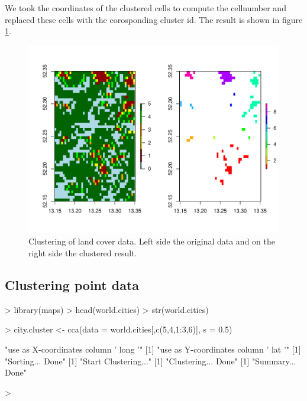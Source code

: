 \documentclass[10pt,a4paper]{article}
\begin{document}
We took the coordinates of the clustered cells to compute the cellnumber and replaced these cells with the corosponding cluster id. The result is shown in figure \ref{fig:landcover}.


\begin{figure}
\centering
\includegraphics[width=\textwidth]{pics/landcover.pdf}
\caption{Clustering of land cover data. Left side the original data and on the right side the clustered result.}
\label{fig:landcover}
\end{figure}

\subsection{Clustering point data}

\begin{Schunk}
\begin{Sinput}
> library(maps)
> head(world.cities)
> str(world.cities)
\end{Sinput}
\end{Schunk}

\begin{Schunk}
\begin{Sinput}
> city.cluster <- cca(data = world.cities[,c(5,4,1:3,6)], s = 0.5)
\end{Sinput}
\begin{Soutput}
[1] "use as X-coordinates column ' long '"
[1] "use as Y-coordinates column ' lat '"
[1] "Sorting... Done"
[1] "Start Clustering..."
[1] "Clustering... Done"
[1] "Summary... Done"
\end{Soutput}
\begin{Sinput}
> 
\end{Sinput}
\end{Schunk}
\end{document}
